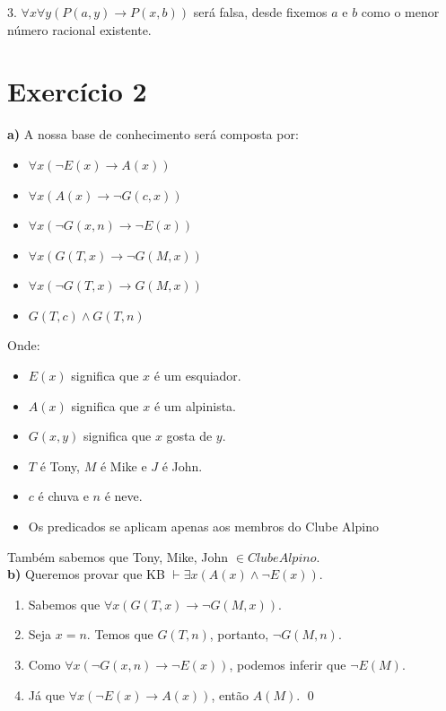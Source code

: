 \documentclass[12pt,letterpaper]{article}
\begin{document}
	3. $\forall x\forall y(P(a,y) \to P(x,b))$ será falsa, desde fixemos $a$ e $b$ como o menor número racional existente.
	
	\section*{Exercício 2}
		
	\textbf{a)} A nossa base de conhecimento será composta por:
	\begin{multicols}{2}
		\begin{itemize}
			\item $\forall x (\lnot E(x)\to A(x))$
			\item $\forall x (A(x)\to \lnot G(c,x))$
			\item $\forall x (\lnot G(x,n)\to\lnot E(x))$
			\item $\forall x (G(T,x)\to\lnot G(M,x))$
			\item $\forall x (\lnot G(T,x)\to G(M,x))$
			\item $G(T,c) \land G(T,n)$
		\end{itemize}
	\end{multicols}
	
	
	Onde:
	
	\begin{itemize}
		\item $E(x)$ significa que $x$ é um esquiador.
		\item $A(x)$ significa que $x$ é um alpinista.
		\item $G(x,y)$ significa que $x$ gosta de $y$.
		\item $T$ é Tony, $M$ é Mike e $J$ é John.
		\item $c$ é chuva e $n$ é neve.
		\item Os predicados se aplicam apenas aos membros do Clube Alpino
	\end{itemize}
	
	Também sabemos que Tony, Mike, John $\in ClubeAlpino$.\\
	
	\textbf{b)} Queremos provar que KB $\vdash \exists x (A(x) \land \lnot E(x))$.
	
	\begin{enumerate}
		\item Sabemos que $\forall x (G(T,x)\to\lnot G(M,x))$.
		\item Seja $x = n$. Temos que $G(T,n)$, portanto, 	$\lnot G(M,n)$.
		\item Como $\forall x (\lnot G(x,n)\to\lnot E(x))$, podemos inferir que $\lnot E(M)$.
		\item Já que  $\forall x (\lnot E(x)\to A(x))$, então	$A(M)$. \qed
	\end{enumerate}
	
\end{document}
